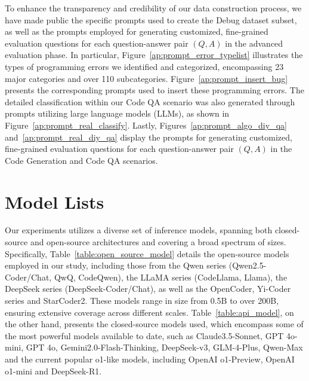 \documentclass[11pt, a4paper, logo, copyright, nonumbering, amsart]{map}
\begin{document}
\begin{CJK*}{UTF8}{gbsn}
To enhance the transparency and credibility of our data construction process, we have made public the specific prompts used to create the Debug dataset subset, as well as the prompts employed for generating customized, fine-grained evaluation questions for each question-answer pair $(Q, A)$ in the advanced evaluation phase. In particular, Figure~\ref{ap:prompt_error_typelist} illustrates the types of programming errors we identified and categorized, encompassing 23 major categories and over 110 subcategories. Figure~\ref{ap:prompt_insert_bug} presents the corresponding prompts used to insert these programming errors. The detailed classification within our Code QA scenario was also generated through prompts utilizing large language models (LLMs), as shown in Figure~\ref{ap:prompt_real_classify}. Lastly, Figures~\ref{ap:prompt_algo_diy_qa} and~\ref{ap:prompt_real_diy_qa} display the prompts for generating customized, fine-grained evaluation questions for each question-answer pair $(Q, A)$ in the Code Generation and Code QA scenarios.

\section{Model Lists} \label{ap:model_lists}

Our experiments utilizes a diverse set of inference models, spanning both closed-source and open-source architectures and covering a broad spectrum of sizes. Specifically, Table~\ref{table:open_source_model} details the open-source models employed in our study, including those from the Qwen series (Qwen2.5-Coder/Chat, QwQ, CodeQwen), the LLaMA series (CodeLlama, Llama), the DeepSeek series (DeepSeek-Coder/Chat), as well as the OpenCoder, Yi-Coder series and StarCoder2. These models range in size from 0.5B to over 200B, ensuring extensive coverage across different scales. Table~\ref{table:api_model}, on the other hand, presents the closed-source models used, which encompass some of the most powerful models available to date, such as Claude3.5-Sonnet, GPT 4o-mini, GPT 4o, Gemini2.0-Flash-Thinking, DeepSeek-v3, GLM-4-Plus, Qwen-Max and the current popular o1-like models, including OpenAI o1-Preview, OpenAI o1-mini and DeepSeek-R1.


\end{CJK*}
\end{document}
